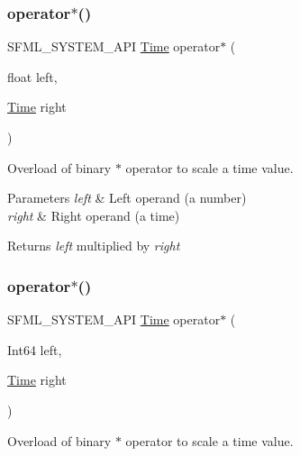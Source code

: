 \subsubsection{\texorpdfstring{operator$\ast$()}{operator*()}\hspace{0.1cm}{\footnotesize\ttfamily [3/4]}}
{\footnotesize\ttfamily S\+F\+M\+L\+\_\+\+S\+Y\+S\+T\+E\+M\+\_\+\+A\+PI \hyperlink{classsf_1_1_time}{Time} operator$\ast$ (\begin{DoxyParamCaption}\item[{float}]{left,  }\item[{\hyperlink{classsf_1_1_time}{Time}}]{right }\end{DoxyParamCaption})\hspace{0.3cm}{\ttfamily [related]}}



Overload of binary $\ast$ operator to scale a time value. 


\begin{DoxyParams}{Parameters}
{\em left} & Left operand (a number) \\
\hline
{\em right} & Right operand (a time)\\
\hline
\end{DoxyParams}
\begin{DoxyReturn}{Returns}
{\itshape left} multiplied by {\itshape right} 
\end{DoxyReturn}
\mbox{\label{classsf_1_1_time_a40a6d0938fb4a43731d54fd90bfc6476}} 
\subsubsection{\texorpdfstring{operator$\ast$()}{operator*()}\hspace{0.1cm}{\footnotesize\ttfamily [4/4]}}
{\footnotesize\ttfamily S\+F\+M\+L\+\_\+\+S\+Y\+S\+T\+E\+M\+\_\+\+A\+PI \hyperlink{classsf_1_1_time}{Time} operator$\ast$ (\begin{DoxyParamCaption}\item[{Int64}]{left,  }\item[{\hyperlink{classsf_1_1_time}{Time}}]{right }\end{DoxyParamCaption})\hspace{0.3cm}{\ttfamily [related]}}



Overload of binary $\ast$ operator to scale a time value. 


